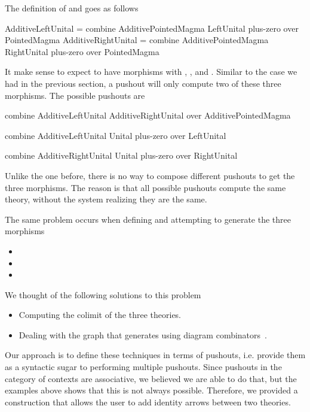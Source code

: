 The definition of  and  goes as follows 
\begin{togcode}
AdditiveLeftUnital = 
  combine AdditivePointedMagma {} LeftUnital plus-zero 
  over PointedMagma
AdditiveRightUnital = 
  combine AdditivePointedMagma {} RightUnital plus-zero 
  over PointedMagma
\end{togcode} 
It make sense to expect  to have morphisms with , , and . Similar to the case we had in the previous section, a pushout will only compute two of these three morphisms. The possible pushouts are 
\begin{togcode}
combine AdditiveLeftUnital {} AdditiveRightUnital {} 
over AdditivePointedMagma
\end{togcode}

\begin{togcode}
combine AdditiveLeftUnital {} Unital plus-zero 
over LeftUnital 
\end{togcode}

\begin{togcode}
combine AdditiveRightUnital {} Unital plus-zero 
over RightUnital 
\end{togcode}

Unlike the one before, there is no way to compose different pushouts to get the three morphisms. The reason is that all possible pushouts compute the same theory, without the system realizing they are the same. 

The same problem occurs when defining  and attempting to generate the three morphisms 
\begin{itemize}
    \item {}
    \item {}
    \item {}
\end{itemize}


We thought of the following solutions to this problem 
\begin{itemize}
    \item Computing the colimit of the three theories. 
    \item Dealing with the graph that generates  using diagram combinators~\cite{cicm2019diagrams}. 
\end{itemize}
Our approach is to define these techniques in terms of pushouts, i.e. provide them as a syntactic sugar to performing multiple pushouts. Since pushouts in the category of contexts are associative, we believed we are able to do that, but the examples above shows that this is not always possible. Therefore, we provided a construction that allows the user to add identity arrows between two theories. 


